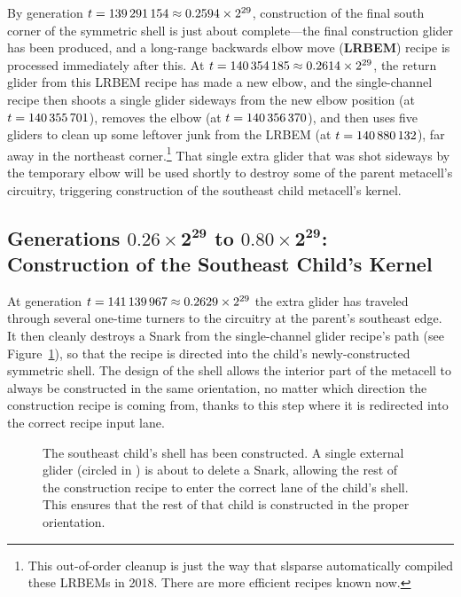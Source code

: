 By generation $t = 139{\,}291{\,}154 \approx 0.2594 \times 2^{29}$, construction of the final south corner of the symmetric shell is just about complete---the final construction glider has been produced, and a long-range backwards elbow move (\textbf{LRBEM}) recipe is processed immediately after this. At $t = 140{\,}354{\,}185 \approx 0.2614 \times 2^{29}$, the return glider from this LRBEM recipe has made a new elbow, and the single-channel recipe then shoots a single glider sideways from the new elbow position (at $t = 140{\,}355{\,}701$), removes the elbow (at $t = 140{\,}356{\,}370$), and then uses five gliders to clean up some leftover junk from the LRBEM (at $t = 140{\,}880{\,}132$), far away in the northeast corner.\footnote{This out-of-order cleanup is just the way that slsparse automatically compiled these LRBEMs in 2018. There are more efficient recipes known now.} That single extra glider that was shot sideways by the temporary elbow will be used shortly to destroy some of the parent metacell's circuitry, triggering construction of the southeast child metacell's kernel.


\subsection{Generations $\mathbf{0.26 \times 2^{29}}$ to $\mathbf{0.80 \times 2^{29}}$: Construction of the Southeast Child's Kernel}\label{sec:0e0p_timeline_kernel}

At generation $t = 141{\,}139{\,}967 \approx 0.2629 \times 2^{29}$ the extra glider has traveled through several one-time turners to the circuitry at the parent's southeast edge. It then cleanly destroys a Snark from the single-channel glider recipe's path (see Figure~\ref{fig:0e0p_timeline_141139967}), so that the recipe is directed into the child's newly-constructed symmetric shell. The design of the shell allows the interior part of the metacell to always be constructed in the same orientation, no matter which direction the construction recipe is coming from, thanks to this step where it is redirected into the correct recipe input lane.

\begin{figure}[!htb]
	\centering
	\caption{The southeast child's shell has been constructed. A single external glider (circled in ) is about to delete a Snark, allowing the rest of the construction recipe to enter the correct lane of the child's shell. This ensures that the rest of that child is constructed in the proper orientation.}
	\label{fig:0e0p_timeline_141139967}
\end{figure}

